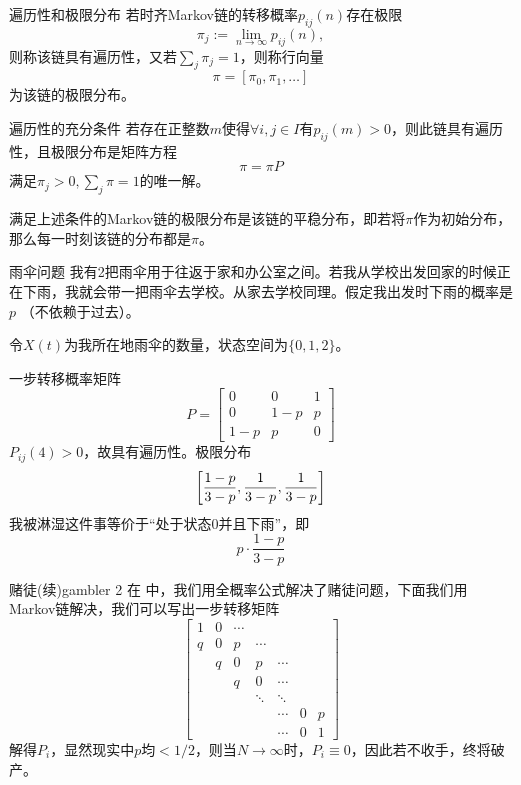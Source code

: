 \begin{definition}{遍历性和极限分布}{}
	若时齐Markov链的转移概率$p_{ij}(n)$存在极限
	\[
		\pi_j:=\lim_{n\to\infty}p_{ij}(n),
	\]
	则称该链具有遍历性，又若$\textstyle\sum_{j}\pi_j=1$，则称行向量
	\[
		\pi=[\pi_0,\pi_1,\ldots]
	\]
	为该链的极限分布。
\end{definition}
\begin{theorem}{遍历性的充分条件}{}
	若存在正整数$m$使得$\forall i,j\in I$有$p_{ij}(m)>0$，则此链具有遍历性，且极限分布是矩阵方程
	\begin{equation}
		\pi=\pi P
	\end{equation}
	满足$\pi_j>0,\textstyle\sum_j\pi=1$的唯一解。
\end{theorem}
满足上述条件的Markov链的极限分布是该链的平稳分布，即若将$\pi$作为初始分布，那么每一时刻该链的分布都是$\pi$。
\begin{example}{雨伞问题}{}
	我有2把雨伞用于往返于家和办公室之间。若我从学校出发回家的时候正在下雨，我就会带一把雨伞去学校。从家去学校同理。假定我出发时下雨的概率是$ p$ （不依赖于过去）。

	令$ X(t) $为我所在地雨伞的数量，状态空间为$\{0, 1, 2\}$。
	
	一步转移概率矩阵
	\[
		P=\begin{bmatrix}
			0&0&1\\
			0&1-p&p\\
			1-p&p&0
		\end{bmatrix}
	\]
	$P_{ij}(4)>0$，故具有遍历性。极限分布
	\[
		\biggl[\frac{1-p}{3-p},\frac1{3-p},\frac1{3-p}\biggr]
	\]
	我被淋湿这件事等价于“处于状态0并且下雨”，即
	\[
		p\cdot\frac{1-p}{3-p}
	\]
\end{example}
\begin{example}{赌徒(续)}{gambler 2}
	在 中，我们用全概率公式解决了赌徒问题，下面我们用Markov链解决，我们可以写出一步转移矩阵
	\[
		\begin{bmatrix}
			1&0&\cdots\\
			q&0&p&\cdots\\
			&q&0&p&\cdots\\
			&&q&0&\cdots\\
			&&&\ddots&\ddots\\
			&&&&\cdots&0&p\\
			&&&&\cdots&0&1
		\end{bmatrix}
	\]
	解得$P_i$，显然现实中$p$均$<1/2$，则当$N\to\infty$时，$P_i\equiv 0$，因此若不收手，终将破产。
\end{example}
